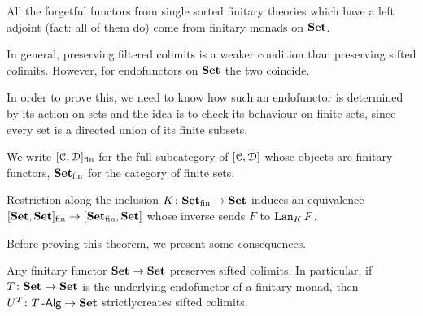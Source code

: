 \documentclass[a4paper,11pt,oneside,openany]{scrbook}
\begin{document}
\begin{exmp}
	All the forgetful functors from single sorted finitary theories which have a left adjoint (fact: all of them do) come from finitary monads on ${\normalfont\textbf{Set}}$.
\end{exmp}

In general, preserving filtered colimits is a weaker condition than preserving sifted colimits. However, for endofunctors on ${\normalfont\textbf{Set}}$ the two coincide.

In order to prove this, we need to know how such an endofunctor is determined by its action on sets and the idea is to check its behaviour on finite sets, since every set is a directed union of its finite subsets.

We write $[\operatorname{\mathcal{C}},\operatorname{\mathcal{D}}]_\text{fin}$ for the full subcategory of $[\operatorname{\mathcal{C}},\operatorname{\mathcal{D}}]$ whose objects are finitary functors, ${\normalfont\textbf{Set}}_\text{fin}$ for the category of finite sets.

\begin{thm}
	Restriction along the inclusion $K\colon{\normalfont\textbf{Set}}_\text{fin}\rightarrow{\normalfont\textbf{Set}}$
	induces an equivalence
	$[{\normalfont\textbf{Set}},{\normalfont\textbf{Set}}]_\text{fin}\rightarrow[{\normalfont\textbf{Set}}_\text{fin},{\normalfont\textbf{Set}}]$ whose inverse
	sends $F$ to $\operatorname{Lan}_KF$.
\end{thm}

Before proving this theorem, we present some consequences.

\begin{cor}
	Any finitary functor ${\normalfont\textbf{Set}}\rightarrow{\normalfont\textbf{Set}}$ preserves sifted colimits. In
    particular, if $T\colon{\normalfont\textbf{Set}}\rightarrow{\normalfont\textbf{Set}}$ is the underlying endofunctor of
    a finitary monad, then $U^T\colon T\operatorname{-\mathsf{Alg}}\rightarrow{\normalfont\textbf{Set}}$ strictlycreates
    sifted colimits.
\end{cor}
\end{document}

